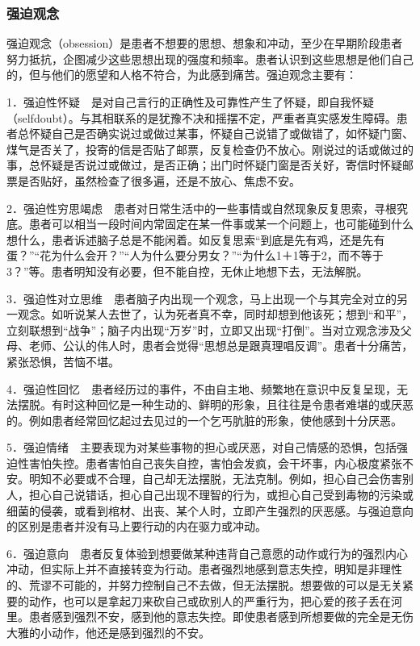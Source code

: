 \subsubsection{强迫观念}

强迫观念（obsession）是患者不想要的思想、想象和冲动，至少在早期阶段患者努力抵抗，企图减少这些思想出现的强度和频率。患者认识到这些思想是他们自己的，但与他们的愿望和人格不符合，为此感到痛苦。强迫观念主要有：

1．强迫性怀疑　是对自己言行的正确性及可靠性产生了怀疑，即自我怀疑（selfdoubt）。与其相联系的是犹豫不决和摇摆不定，严重者真实感发生障碍。患者总怀疑自己是否确实说过或做过某事，怀疑自己说错了或做错了，如怀疑门窗、煤气是否关了，投寄的信是否贴了邮票，反复检查仍不放心。刚说过的话或做过的事，总怀疑是否说过或做过，是否正确；出门时怀疑门窗是否关好，寄信时怀疑邮票是否贴好，虽然检查了很多遍，还是不放心、焦虑不安。

2．强迫性穷思竭虑　患者对日常生活中的一些事情或自然现象反复思索，寻根究底。患者可以相当一段时间内常固定在某一件事或某一个问题上，也可能碰到什么想什么，患者诉述脑子总是不能闲着。如反复思索“到底是先有鸡，还是先有蛋？”“花为什么会开？”“人为什么要分男女？”“为什么1＋1等于2，而不等于3？”等。患者明知没有必要，但不能自控，无休止地想下去，无法解脱。

3．强迫性对立思维　患者脑子内出现一个观念，马上出现一个与其完全对立的另一观念。如听说某人去世了，认为死者真不幸，同时却想到他该死；想到“和平”，立刻联想到“战争”；脑子内出现“万岁”时，立即又出现“打倒”。当对立观念涉及父母、老师、公认的伟人时，患者会觉得“思想总是跟真理唱反调”。患者十分痛苦，紧张恐惧，苦恼不堪。

4．强迫性回忆　患者经历过的事件，不由自主地、频繁地在意识中反复呈现，无法摆脱。有时这种回忆是一种生动的、鲜明的形象，且往往是令患者难堪的或厌恶的。例如患者经常回忆起过去见过的一个乞丐肮脏的形象，使他感到十分厌恶。

5．强迫情绪　主要表现为对某些事物的担心或厌恶，对自己情感的恐惧，包括强迫性害怕失控。患者害怕自己丧失自控，害怕会发疯，会干坏事，内心极度紧张不安。明知不必要或不合理，自己却无法摆脱，无法克制。例如，担心自己会伤害别人，担心自己说错话，担心自己出现不理智的行为，或担心自己受到毒物的污染或细菌的侵袭，或看到棺材、出丧、某个人时，立即产生强烈的厌恶感。与强迫意向的区别是患者并没有马上要行动的内在驱力或冲动。

6．强迫意向　患者反复体验到想要做某种违背自己意愿的动作或行为的强烈内心冲动，但实际上并不直接转变为行动。患者强烈地感到意志失控，明知是非理性的、荒谬不可能的，并努力控制自己不去做，但无法摆脱。想要做的可以是无关紧要的动作，也可以是拿起刀来砍自己或砍别人的严重行为，把心爱的孩子丢在河里。患者感到强烈不安，感到他的意志失控。即使患者感到所想要做的完全是无伤大雅的小动作，他还是感到强烈的不安。

